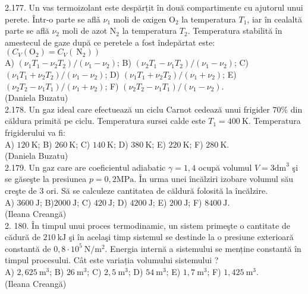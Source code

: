2.177. Un vas termoizolant este despărțit în două compartimente cu ajutorul unui perete. Într-o parte se aflǎ $\nu_{1}$ moli de oxigen $\mathrm{O}_{2}$ la temperatura $T_{1}$, iar în cealaltă parte se află $\nu_{2}$ moli de azot $\mathrm{N}_{2}$ la temperatura $T_{2}$. Temperatura stabilită în amestecul de gaze după ce peretele a fost îndepărtat este: $\left(C_{V}\left(\mathrm{O}_{2}\right)=C_{V}\left(\mathrm{~N}_{2}\right)\right)$\\ A) $\left(\nu_{1} T_{1}-\nu_{2} T_{2}\right) /\left(\nu_{1}-\nu_{2}\right)$; B) $\left(\nu_{2} T_{1}-\nu_{1} T_{2}\right) /\left(\nu_{1}-\nu_{2}\right)$; C) $\left(\nu_{1} T_{1}+\nu_{2} T_{2}\right) /\left(\nu_{1}-\nu_{2}\right)$; D) $\left(\nu_{1} T_{1}+\nu_{2} T_{2}\right) /\left(\nu_{1}+\nu_{2}\right)$; E) $\left(\nu_{2} T_{2}-\nu_{1} T_{1}\right) /\left(\nu_{1}+\nu_{2}\right)$; F) $\left(\nu_{2} T_{2}-\nu_{1} T_{1}\right) /\left(\nu_{1}-\nu_{2}\right)$.\\ (Daniela Buzatu)\\

2.178. Un gaz ideal care efectuează un ciclu Carnot cedează unui frigider $70 \%$ din căldura primită pe ciclu. Temperatura sursei calde este $T_{1}=400 \mathrm{~K}$. Temperatura frigiderului va fi:\\ A) $120 \mathrm{~K}$; B) $260 \mathrm{~K}$; C) $140 \mathrm{~K}$; D) $380 \mathrm{~K}$; E) $220 \mathrm{~K}$; F) $280 \mathrm{~K}$.\\ (Daniela Buzatu)\\

2.179. Un gaz care are coeficientul adiabatic $\gamma=1,4$ ocupă volumul $V=3 \mathrm{dm}^{3}$ şi se găseşte la presiunea $p=0,2 \mathrm{MPa}$. În urma unei încălziri izobare volumul său creşte de 3 ori. Să se calculeze cantitatea de căldură folosită la încălzire.\\ A) $3600 \mathrm{~J}$; B)$2000 \mathrm{~J}$; C) $420 \mathrm{~J}$; D) $4200 \mathrm{~J}$; E) $200 \mathrm{~J}$; F) $8400 \mathrm{~J}$.\\ (Ileana Creangă)\\

2. 180. În timpul unui proces termodinamic, un sistem primeşte o cantitate de cădură de $210 \mathrm{~kJ}$ şi în acelaşi timp sistemul se destinde la o presiune exterioară constantă de $0,8 \cdot 10^{5} \mathrm{~N} / \mathrm{m}^{2}$. Energia internă a sistemului se menține constantă în timpul procesului. Cât este variația volumului sistemului ?\\ A) $2,625 \mathrm{~m}^{3}$; B) $26 \mathrm{~m}^{3}$; C) $2,5 \mathrm{~m}^{3}$; D) $54 \mathrm{~m}^{3}$; E) $1,7 \mathrm{~m}^{3}$; F) $1,425 \mathrm{~m}^{3}$.\\ (Ileana Creangă)\\

